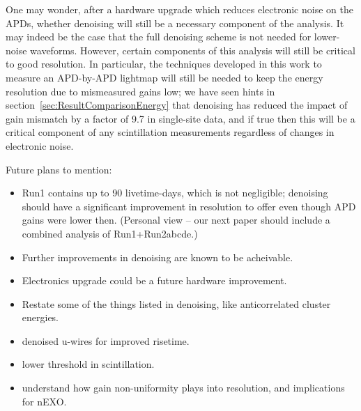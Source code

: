 One may wonder, after a hardware upgrade which reduces electronic noise on the APDs, whether denoising will still be a necessary component of the analysis.  It may indeed be the case that the full denoising scheme is not needed for lower-noise waveforms.  However, certain components of this analysis will still be critical to good resolution.  In particular, the techniques developed in this work to measure an APD-by-APD lightmap will still be needed to keep the energy resolution due to mismeasured gains low; we have seen hints in section~\ref{sec:ResultComparisonEnergy} that denoising has reduced the impact of gain mismatch by a factor of 9.7 in single-site data, and if true then this will be a critical component of any scintillation measurements regardless of changes in electronic noise.


Future plans to mention:
\begin{itemize}
\item Run1 contains up to 90 livetime-days, which is not negligible; denoising should have a significant improvement in resolution to offer even though APD gains were lower then.  (Personal view -- our next paper should include a combined analysis of Run1+Run2abcde.)
\item Further improvements in denoising are known to be acheivable.
\item Electronics upgrade could be a future hardware improvement.
\item Restate some of the things listed in denoising, like anticorrelated cluster energies.
\item denoised u-wires for improved risetime.
\item lower threshold in scintillation.
\item understand how gain non-uniformity plays into resolution, and implications for nEXO.
\end{itemize}
